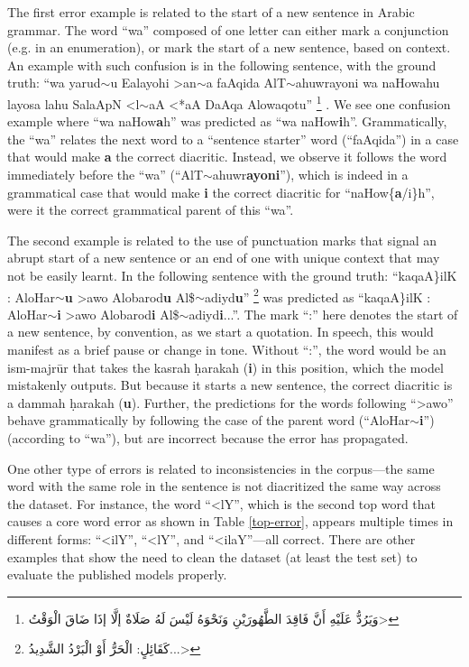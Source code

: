 \documentclass[11pt]{article}
\begin{document}
The first error example is related to the start of a new sentence in Arabic grammar. The word “wa” composed of one letter can either mark a conjunction (e.g. in an enumeration), or mark the start of a new sentence, based on context. An example with such confusion is in the following sentence, with the ground truth: ``wa yarud$\sim$u Ealayohi >an$\sim$a faAqida AlT$\sim$ahuwrayoni wa naHowahu layosa lahu SalaApN
<l$\sim$aA <*aA DaAqa Alowaqotu''
\footnote{\<وَيَرُدُّ عَلَيْهِ أَنَّ فَاقِدَ الطَّهُورَيْنِ وَنَحْوَهُ لَيْسَ لَهُ صَلَاةٌ إلَّا إذَا ضَاقَ الْوَقْتُ>}
. We see one confusion example where ``wa naHow\textbf{a}h'' was predicted as ``wa naHow\textbf{i}h''. Grammatically, the ``wa'' relates the next word to a ``sentence starter'' word (``faAqida'') in a case that would make \textbf{a} the correct diacritic. Instead, we observe it follows the word immediately before the ``wa'' (``AlT$\sim$ahuwr\textbf{ayoni}''), which is indeed in a grammatical case that would make \textbf{i} the correct diacritic for ``naHow\{\textbf{a}/i\}h'', were it the correct grammatical parent of this ``wa''.

The second example is related to the use of punctuation marks that signal an abrupt start of a new sentence or an end of one with unique context that may not be easily learnt. In the following sentence with the ground truth: ``kaqaA\}ilK : AloHar$\sim$\textbf{u} >awo Alobarod\textbf{u} Al\$$\sim$adiyd\textbf{u}''
\footnote{\<كَقَائِلٍ: الْحَرُّ أَوْ الْبَرْدُ الشَّدِيدُ...>} 
was predicted as ``kaqaA\}ilK : AloHar$\sim$\textbf{i} >awo Alobarod\textbf{i} Al\$$\sim$adiyd\textbf{i}...''. The mark “:” here denotes the start of a new sentence, by convention, as we start a quotation. In speech, this would manifest as a brief pause or change in tone. Without “:”, the word would be an ism-majrūr that takes the kasrah \d{h}arakah (\textbf{i}) in this position, which the model mistakenly outputs. But because it starts a new sentence, the correct diacritic is a dammah \d{h}arakah (\textbf{u}). Further, the predictions for the words following ``>awo'' behave grammatically by following the case of the parent word (``AloHar$\sim$\textbf{i}'') (according to ``wa''), but are incorrect because the error has propagated.

One other type of errors is related to inconsistencies in the corpus---the same word with the same role in the sentence is not diacritized the same way across the dataset. For instance, the word ``<lY'', which is the second top word that causes a core word error as shown in Table \ref{top-error}, appears multiple times in different forms: ``<ilY'', ``<lY'', and ``<ilaY''---all correct. There are other examples that show the need to clean the dataset (at least the test set) to evaluate the published models properly.
\end{document}
